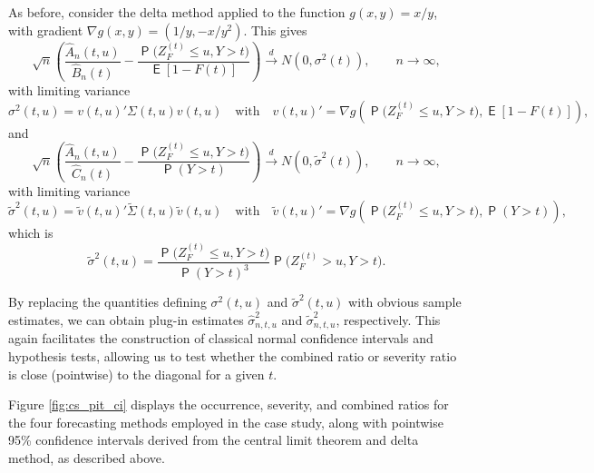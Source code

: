 \documentclass[12pt]{article}
\newcommand{\Q}{\operatorname{\mathsf{P}}}
\newcommand{\expec}{\operatorname{\mathsf{E}}} %
\newcommand{\1}{\mathbf{1}} %
\newcommand{\ZFt}{Z_{F}^{(t)}} %
\theoremstyle{definition}
\begin{document}
As before, consider the delta method applied to the function $g(x, y) = x/y$, with gradient $\nabla g(x, y) = (1/y, -x/y^2)$. This gives
\begin{equation}
    \label{eq:combratCLT}
    \sqrt{n} \left(
        \frac{\widehat{A}_{n}(t, u)}{\widehat{B}_n(t)} - 
        \frac{\Q\bigl(\ZFt \le u, Y > t \bigr)}{\expec[1-F(t)]}
    \right)
    \xrightarrow{d}
    N(0, \sigma^2(t)), \qquad n \to \infty,
\end{equation}
with limiting variance
\[
    \sigma^2(t,u)
    = v(t,u)' \Sigma(t,u) v(t,u)
    \quad \text{with} \quad
    v(t,u)' = \nabla g \left(\Q\bigl(\ZFt \le u, Y > t \bigr), \expec[1-F(t)] \right),
\]
and
\begin{equation}
    \label{eq:sevratCLT}
    \sqrt{n} \left(
        \frac{\widehat{A}_{n}(t, u)}{\widehat{C}_n(t)} - 
        \frac{\Q\bigl(\ZFt \le u, Y > t \bigr)}{\Q(Y > t)}
    \right)
    \xrightarrow{d}
    N(0, \tilde{\sigma}^2(t)), \qquad n \to \infty,
\end{equation}
with limiting variance
\[
    \tilde{\sigma}^2(t,u)
    = \tilde{v}(t,u)' \tilde{\Sigma}(t,u) \tilde{v}(t,u)
    \quad \text{with} \quad
    \tilde{v}(t,u)' = \nabla g \left(\Q\bigl(\ZFt \le u, Y > t \bigr), \Q(Y > t) \right),
\]
which is
\[
    \tilde{\sigma}^2(t,u) = \frac{\Q\bigl(\ZFt \le u, Y > t \bigr)}{\Q(Y > t)^3}\Q\bigl(\ZFt > u, Y > t \bigr).
\]


By replacing the quantities defining $\sigma^2(t,u)$ and $\tilde{\sigma}^2(t,u)$ with obvious sample estimates, we can obtain plug-in estimates $\hat{\sigma}^2_{n,t,u}$ and $\tilde{\sigma}^2_{n,t,u}$, respectively. This again facilitates the construction of classical normal confidence intervals and hypothesis tests, allowing us to test whether the combined ratio or severity ratio is close (pointwise) to the diagonal for a given $t$.

Figure \ref{fig:cs_pit_ci} displays the occurrence, severity, and combined ratios for the four forecasting methods employed in the case study, along with pointwise 95\% confidence intervals derived from the central limit theorem and delta method, as described above.
\end{document}
